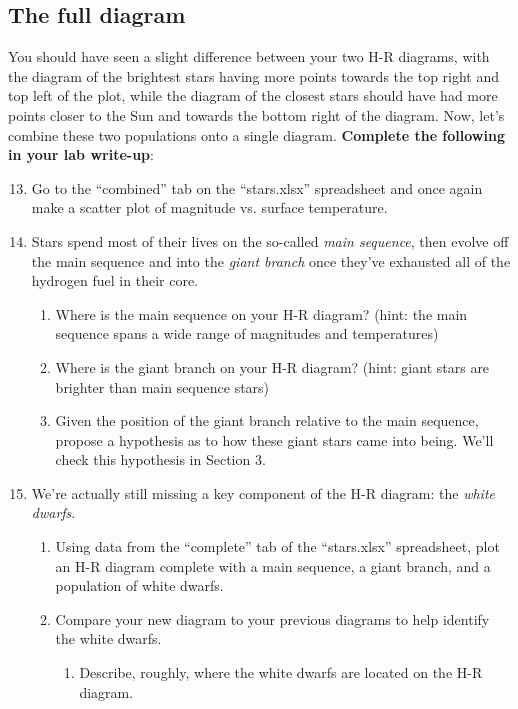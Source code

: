 \documentclass[11pt]{article}
\begin{document}
\subsection{The full diagram}
You should have seen a slight difference between your two H-R diagrams, with the diagram of the brightest stars having more points towards the top right and top left of the plot, while the diagram of the closest stars should have had more points closer to the Sun and towards the bottom right of the diagram. Now, let's combine these two populations onto a single diagram. \textbf{Complete the following in your lab write-up}:
\begin{enumerate}
\setcounter{enumi}{12}

    \item Go to the ``combined'' tab on the ``stars.xlsx'' spreadsheet and once again make a scatter plot of magnitude vs. surface temperature.
    
    \item Stars spend most of their lives on the so-called \emph{main sequence}, then evolve off the main sequence and into the \emph{giant branch} once they've exhausted all of the hydrogen fuel in their core.
    \begin{enumerate}
        \item Where is the main sequence on your H-R diagram? (hint: the main sequence spans a wide range of magnitudes and temperatures)
        
        \item Where is the giant branch on your H-R diagram? (hint: giant stars are brighter than main sequence stars)
        
        \item Given the position of the giant branch relative to the main sequence, propose a hypothesis as to how these giant stars came into being. We'll check this hypothesis in Section 3.
    
    \end{enumerate}
    
    \item We're actually still missing a key component of the H-R diagram: the \emph{white dwarfs}.
    \begin{enumerate}
        \item Using data from the ``complete'' tab of the ``stars.xlsx'' spreadsheet, plot an H-R diagram complete with a main sequence, a giant branch, and a population of white dwarfs.
        
        \item Compare your new diagram to your previous diagrams to help identify the white dwarfs.
        \begin{enumerate}
            \item Describe, roughly, where the white dwarfs are located on the H-R diagram. 
            

\end{enumerate}
\end{enumerate}
\end{enumerate}
\end{document}
